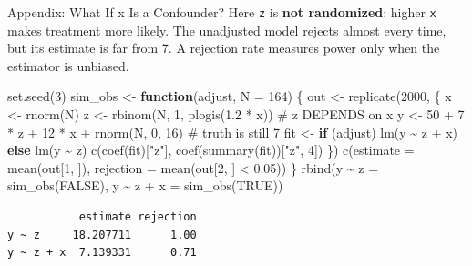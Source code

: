 \documentclass[
  ignorenonframetext,
  aspectratio=169,
]{beamer}
\newenvironment{Shaded}{\begin{snugshade}}{\end{snugshade}}
\newcommand{\AttributeTok}[1]{\textcolor[rgb]{0.40,0.45,0.13}{#1}}
\newcommand{\CommentTok}[1]{\textcolor[rgb]{0.37,0.37,0.37}{#1}}
\newcommand{\ConstantTok}[1]{\textcolor[rgb]{0.56,0.35,0.01}{#1}}
\newcommand{\ControlFlowTok}[1]{\textcolor[rgb]{0.00,0.23,0.31}{\textbf{#1}}}
\newcommand{\DecValTok}[1]{\textcolor[rgb]{0.68,0.00,0.00}{#1}}
\newcommand{\FloatTok}[1]{\textcolor[rgb]{0.68,0.00,0.00}{#1}}
\newcommand{\FunctionTok}[1]{\textcolor[rgb]{0.28,0.35,0.67}{#1}}
\newcommand{\NormalTok}[1]{\textcolor[rgb]{0.00,0.23,0.31}{#1}}
\newcommand{\OtherTok}[1]{\textcolor[rgb]{0.00,0.23,0.31}{#1}}
\newcommand{\SpecialCharTok}[1]{\textcolor[rgb]{0.37,0.37,0.37}{#1}}
\newcommand{\StringTok}[1]{\textcolor[rgb]{0.13,0.47,0.30}{#1}}
\begin{document}
\begin{frame}[fragile]{Appendix: What If x Is a Confounder?}
\label{appendix-what-if-x-is-a-confounder}
\scriptsize Here \texttt{z} is \textbf{not randomized}: higher
\texttt{x} makes treatment more likely. The unadjusted model rejects
almost every time, but its estimate is far from 7. A rejection rate
measures power only when the estimator is unbiased.

\begin{Shaded}
\begin{Highlighting}[]
\FunctionTok{set.seed}\NormalTok{(}\DecValTok{3}\NormalTok{)}
\NormalTok{sim\_obs }\OtherTok{\textless{}{-}} \ControlFlowTok{function}\NormalTok{(adjust, }\AttributeTok{N =} \DecValTok{164}\NormalTok{) \{}
\NormalTok{  out }\OtherTok{\textless{}{-}} \FunctionTok{replicate}\NormalTok{(}\DecValTok{2000}\NormalTok{, \{}
\NormalTok{    x }\OtherTok{\textless{}{-}} \FunctionTok{rnorm}\NormalTok{(N)}
\NormalTok{    z }\OtherTok{\textless{}{-}} \FunctionTok{rbinom}\NormalTok{(N, }\DecValTok{1}\NormalTok{, }\FunctionTok{plogis}\NormalTok{(}\FloatTok{1.2} \SpecialCharTok{*}\NormalTok{ x)) }\CommentTok{\# z DEPENDS on x}
\NormalTok{    y }\OtherTok{\textless{}{-}} \DecValTok{50} \SpecialCharTok{+} \DecValTok{7} \SpecialCharTok{*}\NormalTok{ z }\SpecialCharTok{+} \DecValTok{12} \SpecialCharTok{*}\NormalTok{ x }\SpecialCharTok{+} \FunctionTok{rnorm}\NormalTok{(N, }\DecValTok{0}\NormalTok{, }\DecValTok{16}\NormalTok{) }\CommentTok{\# truth is still 7}
\NormalTok{    fit }\OtherTok{\textless{}{-}} \ControlFlowTok{if}\NormalTok{ (adjust) }\FunctionTok{lm}\NormalTok{(y }\SpecialCharTok{\textasciitilde{}}\NormalTok{ z }\SpecialCharTok{+}\NormalTok{ x) }\ControlFlowTok{else} \FunctionTok{lm}\NormalTok{(y }\SpecialCharTok{\textasciitilde{}}\NormalTok{ z)}
    \FunctionTok{c}\NormalTok{(}\FunctionTok{coef}\NormalTok{(fit)[}\StringTok{"z"}\NormalTok{], }\FunctionTok{coef}\NormalTok{(}\FunctionTok{summary}\NormalTok{(fit))[}\StringTok{"z"}\NormalTok{, }\DecValTok{4}\NormalTok{])}
\NormalTok{  \})}
  \FunctionTok{c}\NormalTok{(}\AttributeTok{estimate =} \FunctionTok{mean}\NormalTok{(out[}\DecValTok{1}\NormalTok{, ]), }\AttributeTok{rejection =} \FunctionTok{mean}\NormalTok{(out[}\DecValTok{2}\NormalTok{, ] }\SpecialCharTok{\textless{}} \FloatTok{0.05}\NormalTok{))}
\NormalTok{\}}
\FunctionTok{rbind}\NormalTok{(}\StringTok{\textasciigrave{}}\AttributeTok{y \textasciitilde{} z}\StringTok{\textasciigrave{}} \OtherTok{=} \FunctionTok{sim\_obs}\NormalTok{(}\ConstantTok{FALSE}\NormalTok{), }\StringTok{\textasciigrave{}}\AttributeTok{y \textasciitilde{} z + x}\StringTok{\textasciigrave{}} \OtherTok{=} \FunctionTok{sim\_obs}\NormalTok{(}\ConstantTok{TRUE}\NormalTok{))}
\end{Highlighting}
\end{Shaded}

\begin{verbatim}
           estimate rejection
y ~ z     18.207711      1.00
y ~ z + x  7.139331      0.71
\end{verbatim}
\end{frame}
\end{document}
